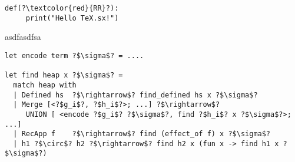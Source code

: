 \documentclass{article}
\begin{document}
\begin{verbatim} 
def(?\textcolor{red}{RR}?):
     print("Hello TeX.sx!")
\end{verbatim}
asdfasdfsa

\begin{verbatim}  
let encode term ?$\sigma$? = ....

let find heap x ?$\sigma$? =
  match heap with 
  | Defined hs  ?$\rightarrow$? find_defined hs x ?$\sigma$? 
  | Merge [<?$g_i$?, ?$h_i$?>; ...] ?$\rightarrow$? 
     UNION [ <encode ?$g_i$? ?$\sigma$?, find ?$h_i$? x ?$\sigma$?>; ...]
  | RecApp f    ?$\rightarrow$? find (effect_of f) x ?$\sigma$?
  | h1 ?$\circ$? h2 ?$\rightarrow$? find h2 x (fun x -> find h1 x ?$\sigma$?)
\end{verbatim}
\end{document}
